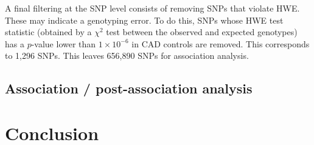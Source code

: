 \documentclass[a4paper, 12pt]{article}
\begin{document}
A final filtering at the SNP level consists of removing SNPs that violate HWE. These may indicate a genotyping error. To do this, SNPs whose HWE test statistic (obtained by a $\chi^2$ test between the observed and expected genotypes) has a $p$-value lower than $1 \times 10^{-6}$ in CAD controls are removed. This corresponds to 1,296 SNPs. This leaves 656,890 SNPs for association analysis. 

\subsection{Association / post-association analysis}


\newpage

\section{Conclusion}


\nocite{*}



\end{document}
